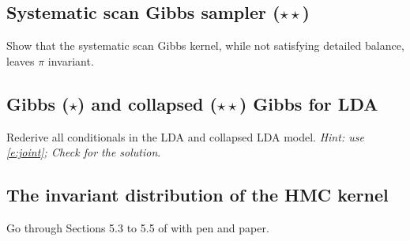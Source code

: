 \documentclass{article}
\begin{document}
\subsection{Systematic scan Gibbs sampler ($\star\star$)}
Show that the systematic scan Gibbs kernel, while not satisfying detailed balance, leaves $\pi$ invariant.

\subsection{Gibbs ($\star$) and collapsed ($\star\star$) Gibbs for LDA}
Rederive all conditionals in the LDA and collapsed LDA model.  \emph{Hint: use \eqref{e:joint}; Check \citep[Section 27.3.4]{Mur12} for the solution}.

\subsection{The invariant distribution of the HMC kernel}
Go through Sections 5.3 to 5.5 of \cite{BoSa18} with pen and paper.



\end{document}
